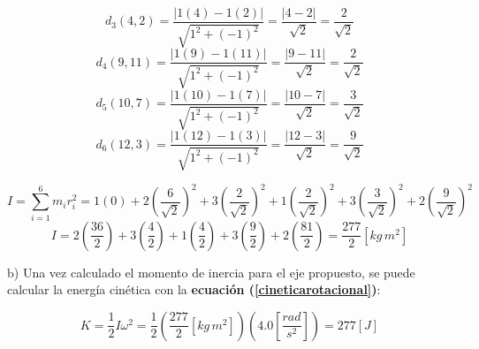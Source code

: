 \documentclass[letter,11pt]{article}
\begin{document}
\begin{minipage}[b]{.9\linewidth}
\begin{equation*}
    d_3(4,2) = \frac{| 1 (4) - 1 (2) |}{\sqrt{1^2 + (-1)^2}} = \frac{|4 - 2|}{\sqrt{2}} = \frac{2}{\sqrt{2}}
\end{equation*}
\begin{equation*}
    d_4(9,11) = \frac{| 1 (9) - 1 (11) |}{\sqrt{1^2 + (-1)^2}} = \frac{|9 - 11|}{\sqrt{2}} = \frac{2}{\sqrt{2}}
\end{equation*}
\begin{equation*}
    d_5(10,7) = \frac{| 1 (10) - 1 (7) |}{\sqrt{1^2 + (-1)^2}} = \frac{|10 - 7|}{\sqrt{2}} = \frac{3}{\sqrt{2}}
\end{equation*}
\begin{equation*}
    d_6(12,3) = \frac{| 1 (12) - 1 (3) |}{\sqrt{1^2 + (-1)^2}} = \frac{|12 - 3|}{\sqrt{2}} = \frac{9}{\sqrt{2}}
\end{equation*}

\begin{equation*}
    I = \sum_{i=1}^{6} m_i r^2_i = 1 (0) + 2\left(\frac{6}{\sqrt{2}}\right)^2 + 3\left(\frac{2}{\sqrt{2}}\right)^2 + 1\left(\frac{2}{\sqrt{2}}\right)^2 + 3\left(\frac{3}{\sqrt{2}}\right)^2 + 2\left(\frac{9}{\sqrt{2}}\right)^2
\end{equation*}
\begin{equation*}
    I = 2 \left(\frac{36}{2}\right) + 3 \left(\frac{4}{2}\right) + 1 \left(\frac{4}{2}\right) + 3 \left(\frac{9}{2}\right) + 2 \left(\frac{81}{2}\right) = \frac{277}{2} [kg\, m^2]
\end{equation*}

b) Una vez calculado el momento de inercia para el eje propuesto, se puede
calcular la energía cinética con la \textbf{ecuación
(\ref{cineticarotacional})}:

\begin{equation*}
    K = \frac{1}{2} I \omega^2 =  \frac{1}{2} \left(\frac{277}{2} [kg\, m^2]\right) \left(4.0 \left[\frac{rad}{s^2}\right]\right) = 277 [J]
\end{equation*}
\end{minipage}
\end{document}
